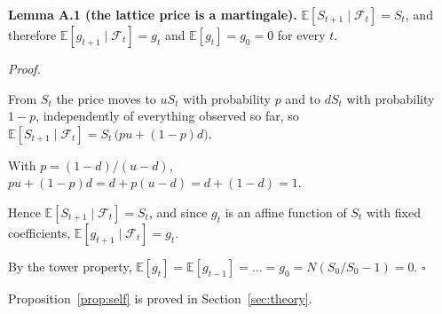 \documentclass[11pt]{article}
\newcommand{\E}{\mathbb{E}}
\newenvironment{steps}{\begin{list}{}{\setlength{\leftmargin}{3.6em}\setlength{\labelwidth}{3.2em}\setlength{\labelsep}{0.4em}\setlength{\itemsep}{2pt}\setlength{\topsep}{3pt}\setlength{\parsep}{0pt}\renewcommand{\makelabel}[1]{##1\hfil}}}{\end{list}}
\begin{document}
\textbf{Lemma A.1 (the lattice price is a martingale).} $\E[S_{t+1}\mid\mathcal F_t]=S_t$, and therefore $\E[g_{t+1}\mid\mathcal F_t]=g_t$ and $\E[g_t]=g_0=0$ for every $t$.

\emph{Proof.}
\begin{steps}
\item[\emph{Step 1.}] From $S_t$ the price moves to $uS_t$ with probability $p$ and to $dS_t$ with probability $1-p$, independently of everything observed so far, so $\E[S_{t+1}\mid\mathcal F_t]=S_t\,\big(pu+(1-p)d\big)$.
\item[\emph{Step 2.}] With $p=(1-d)/(u-d)$, $pu+(1-p)d=d+p(u-d)=d+(1-d)=1$.
\item[\emph{Step 3.}] Hence $\E[S_{t+1}\mid\mathcal F_t]=S_t$, and since $g_t$ is an affine function of $S_t$ with fixed coefficients, $\E[g_{t+1}\mid\mathcal F_t]=g_t$.
\item[\emph{Step 4.}] By the tower property, $\E[g_t]=\E[g_{t-1}]=\dots=g_0=N(S_0/S_0-1)=0$. \hfill$\square$
\end{steps}

Proposition~\ref{prop:self} is proved in Section~\ref{sec:theory}.
\end{document}
